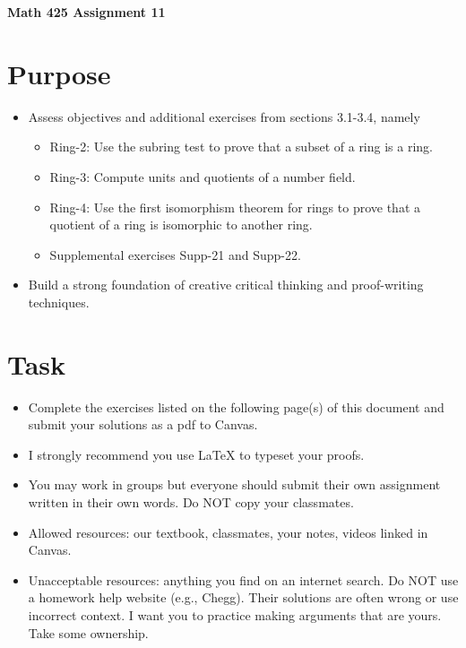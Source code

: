 \documentclass[12pt]{article}
\begin{document}
	\begin{center}
		{\Large \bf Math 425 Assignment 11}
	\end{center}
	\section*{Purpose}
	\begin{itemize}
		\item Assess objectives and additional exercises from sections 3.1-3.4, namely
		\begin{itemize} 
			\item Ring-2: Use the subring test to prove that a subset of a ring is a ring.
			\item Ring-3: Compute units and quotients of a number field.
			\item Ring-4: Use the first isomorphism theorem for rings to prove that a quotient of a ring is isomorphic to another ring.
			\item Supplemental exercises Supp-21 and Supp-22.
		\end{itemize}
		\item Build a strong foundation of creative critical thinking and proof-writing techniques.
	\end{itemize}
	\section*{Task}
	\begin{itemize}
		\item Complete the exercises listed on the following page(s) of this document and submit your solutions as a pdf to Canvas.
		\item I strongly recommend you use LaTeX to typeset your proofs.
		\item You may work in groups but everyone should submit their own assignment written in their own words.  Do NOT copy your classmates.
		\item Allowed resources: our textbook, classmates, your notes, videos linked in Canvas.
		\item Unacceptable resources: anything you find on an internet search. Do NOT use a homework help website (e.g., Chegg). Their solutions are often wrong or use incorrect context.  I want you to practice making arguments that are yours. Take some ownership.
	\end{itemize}
\end{document}
